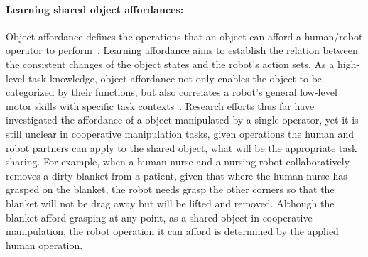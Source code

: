 \documentclass[letterpaper, 11 pt, onecolumn]{article}
\newcommand{\zhi}[1]{\textcolor{blue}{ZL: #1}}
\begin{document}



\paragraph*{Learning shared object affordances:}

Object affordance defines the operations that an object can afford a human/robot operator to perform~\cite{gibson2014ecological}. Learning affordance aims to establish the relation between the consistent changes of the object states and the robot’s action sets. As a high-level task knowledge, object affordance not only enables the object to be categorized by their functions, but also correlates a robot's general low-level motor skills with specific task contexts~\cite{fitzpatrick2003learning, veloso2005learning, thomaz2009learning,lopes2007affordance,montesano2008learning, lopes2010abstraction, kjellstrom2011visual,aksoy2011learning}. Research efforts thus far have investigated the affordance of a object manipulated by a single operator, yet it is still unclear in cooperative manipulation tasks, given operations the human and robot partners can apply to the shared object, what will be the appropriate task sharing. For example, when a human nurse and a nursing robot collaboratively removes a dirty blanket from a patient, given that where the human nurse has grasped on the blanket, the robot needs grasp the other corners so that the blanket will not be drag away but will be lifted and removed. Although the blanket afford grasping at any point, as a shared object in cooperative manipulation, the robot operation it can afford is determined by the applied human operation. 
\end{document}
